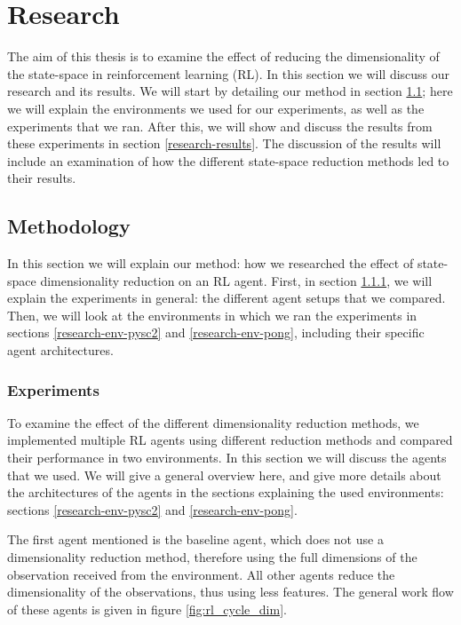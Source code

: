 \chapter{Research}\label{research}
The aim of this thesis is to examine the effect of reducing the dimensionality of the state-space in reinforcement learning (RL). In this section we will discuss our research and its results. We will start by detailing our method in section \ref{research-method}; here we will explain the environments we used for our experiments, as well as the experiments that we ran. After this, we will show and discuss the results from these experiments in section \ref{research-results}. The discussion of the results will include an examination of how the different state-space reduction methods led to their results.

\section{Methodology}\label{research-method}
In this section we will explain our method: how we researched the effect of state-space dimensionality reduction on an RL agent. First, in section \ref{research-exp}, we will explain the experiments in general: the different agent setups that we compared. Then, we will look at the environments in which we ran the experiments in sections \ref{research-env-pysc2} and \ref{research-env-pong}, including their specific agent architectures.

\subsection{Experiments}\label{research-exp}
To examine the effect of the different dimensionality reduction methods, we implemented multiple RL agents using different reduction methods and compared their performance in two environments. In this section we will discuss the agents that we used. We will give a general overview here, and give more details about the architectures of the agents in the sections explaining the used environments: sections \ref{research-env-pysc2} and \ref{research-env-pong}.

The first agent mentioned is the baseline agent, which does not use a dimensionality reduction method, therefore using the full dimensions of the observation received from the environment. All other agents reduce the dimensionality of the observations, thus using less features. The general work flow of these agents is given in figure \ref{fig:rl_cycle_dim}.

